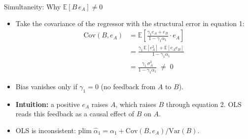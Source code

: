 \documentclass[aspectratio=169, handout]{beamer}
\numberwithin{equation}{section}
\begin{document}
\begin{frame}{Simultaneity: Why $\mathbb{E}[B\,e_A]\neq 0$}
\begin{itemize}
\item Take the covariance of the regressor with the structural error in equation 1:
\begin{align*}
\text{Cov}(B, e_A) &= \mathbb{E}\!\left[\frac{\gamma_1 e_A + e_B}{1-\gamma_1\alpha_1}\cdot e_A\right]\\
&= \frac{\gamma_1\,\mathbb{E}[e_A^2] + \mathbb{E}[e_A e_B]}{1-\gamma_1\alpha_1}\\
&= \frac{\gamma_1\,\sigma_A^2}{1-\gamma_1\alpha_1}\;\neq\;0
\end{align*}
\item Bias vanishes only if $\gamma_1=0$ (no feedback from $A$ to $B$).
\item \textbf{Intuition:} a positive $e_A$ raises $A$, which raises $B$ through equation 2. OLS reads this feedback as a causal effect of $B$ on $A$.
\item OLS is inconsistent: $\text{plim}\;\hat{\alpha}_1 = \alpha_1 + \text{Cov}(B,e_A)/\text{Var}(B)$.
\end{itemize}
\end{frame}
\end{document}
